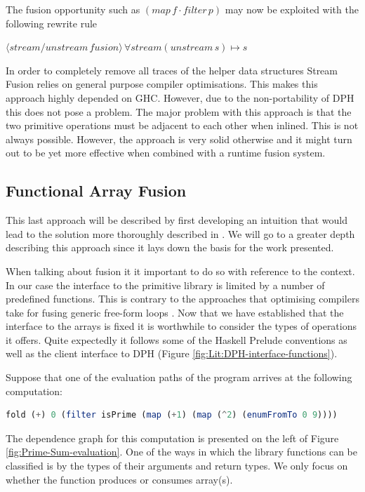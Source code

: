 \documentclass[preamble.tex]{subfiles}
\begin{document}
The fusion opportunity such as $(map\, f\cdot filter\, p)$ may now be exploited with the following rewrite rule

$\langle stream/unstream\, fusion\rangle\,\forall stream(unstream\, s)\mapsto s$

In order to completely remove all traces of the helper data structures Stream Fusion relies on general purpose compiler optimisations. This makes this approach highly depended on GHC. However, due to the non-portability of DPH this does not pose a problem. The major problem with this approach is that the two primitive operations must be adjacent to each other when inlined. This is not always possible. However, the approach is very solid otherwise and it might turn out to be yet more effective when combined with a runtime fusion system.


\subsection{Functional Array Fusion}

This last approach will be described by first developing an intuition that would lead to the solution more thoroughly described in \cite{CK01,CK03}. We will go to a greater depth describing this approach since it lays down the basis for the work presented.

When talking about fusion it it important to do so with reference to the context. In our case the interface to the primitive library is limited by a number of predefined functions. This is contrary to the approaches that optimising compilers take for fusing generic free-form loops \cite{KA02}. Now that we have established that the interface to the arrays is fixed it is worthwhile to consider the types of operations it offers. Quite expectedly it follows some of the Haskell Prelude conventions as well as the client interface to DPH (Figure \vref{fig:Lit:DPH-interface-functions}).

Suppose that one of the evaluation paths of the program arrives at the following computation:

\begin{lstlisting}[basicstyle={\ttfamily},language=Haskell]
fold (+) 0 (filter isPrime (map (+1) (map (^2) (enumFromTo 0 9))))
\end{lstlisting}


The dependence graph \cite{RMKB06,KA02} for this computation is presented on the left of Figure \vref{fig:Prime-Sum-evaluation}. One of the ways in which the library functions can be classified is by the types of their arguments and return types. We only focus on whether the function produces or consumes array(s).
\end{document}
